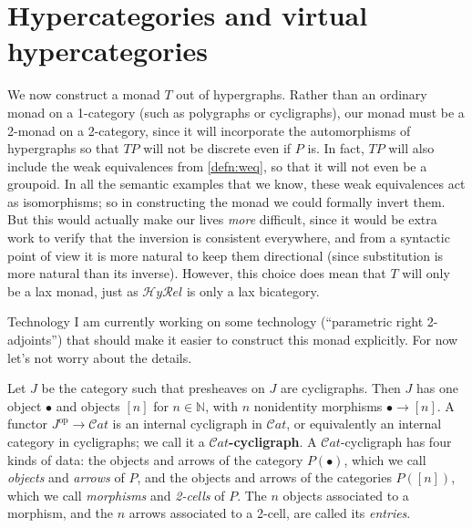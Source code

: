 \documentclass{article}
\theoremstyle{definition}
\theoremstyle{remark}
\def\Cat{\ensuremath{\mathcal{C}\mathit{at}}}
\def\op{^{\mathrm{op}}}
\def\N{\mathbb{N}}
\def\hyrel{\mathcal{H}\mathit{y}\mathcal{R}\mathit{el}}
\begin{document}
\section{Hypercategories and virtual hypercategories}
\label{sec:hypercats}

We now construct a monad $T$ out of hypergraphs.
Rather than an ordinary monad on a 1-category (such as polygraphs or cycligraphs), our monad must be a 2-monad on a 2-category, since it will incorporate the automorphisms of hypergraphs so that $T P$ will not be discrete even if $P$ is.
In fact, $T P$ will also include the weak equivalences from \cref{defn:weq}, so that it will not even be a groupoid.
In all the semantic examples that we know, these weak equivalences act as isomorphisms; so in constructing the monad we could formally invert them.
But this would actually make our lives \emph{more} difficult, since it would be extra work to verify that the inversion is consistent everywhere, and from a syntactic point of view it is more natural to keep them directional (since substitution is more natural than its inverse).
However, this choice does mean that $T$ will only be a lax monad, just as $\hyrel$ is only a lax bicategory.

\begin{anfxnote}{Technology}
  I am currently working on some technology (``parametric right 2-adjoints'') that should make it easier to construct this monad explicitly.
  For now let's not worry about the details.
\end{anfxnote}

Let $J$ be the category such that presheaves on $J$ are cycligraphs.
Then $J$ has one object $\bullet$ and objects $[n]$ for $n\in\N$, with $n$ nonidentity morphisms $\bullet\to [n]$.
A functor $J\op\to\Cat$ is an internal cycligraph in \Cat, or equivalently an internal category in cycligraphs; we call it a \textbf{\Cat-cycligraph}.
A \Cat-cycligraph has four kinds of data: the objects and arrows of the category $P(\bullet)$, which we call \emph{objects} and \emph{arrows} of $P$, and the objects and arrows of the categories $P([n])$, which we call \emph{morphisms} and \emph{2-cells} of $P$.
The $n$ objects associated to a morphism, and the $n$ arrows associated to a 2-cell, are called its \emph{entries}.
\end{document}
